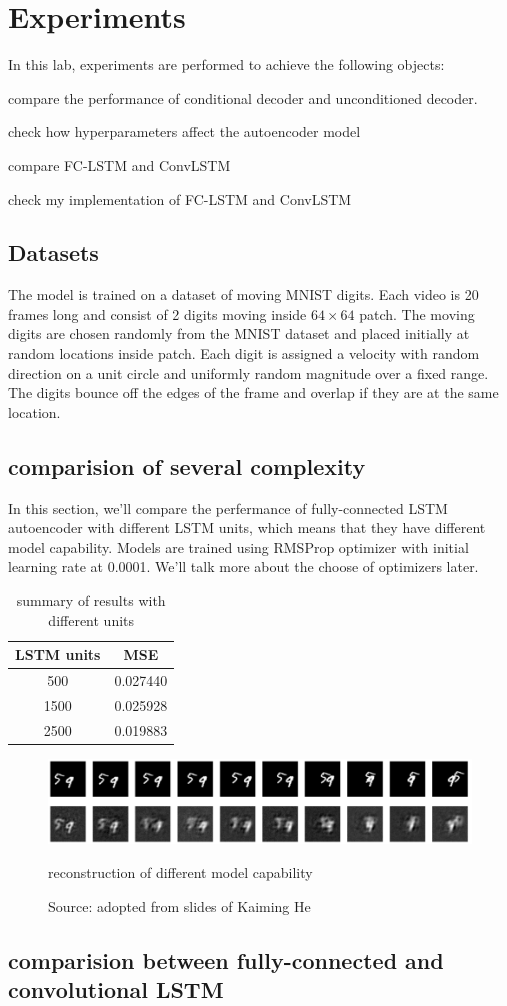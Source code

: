 \documentclass[twoside,a4paper,article]{combine}
\begin{document}
\section{Experiments}
In this lab, experiments are performed to achieve the following objects:

compare the performance of conditional decoder and unconditioned decoder.

check how hyperparameters affect the autoencoder model

compare FC-LSTM and ConvLSTM 

check my implementation of FC-LSTM and ConvLSTM
\subsection{Datasets}
The model is trained on a dataset of moving MNIST digits. Each video is 20 frames long and consist of 2 digits moving inside $64\times64$
patch. The moving digits are chosen randomly from the MNIST dataset and placed initially at random locations inside patch. Each digit is
assigned a velocity with random direction on a unit circle and uniformly random magnitude over a fixed range. The digits bounce off the 
edges of the frame and overlap if they are at the same location.

\subsection{comparision of several complexity}
In this section, we'll compare the perfermance of fully-connected LSTM autoencoder with different LSTM units, which means that they have
different model capability. Models are trained using RMSProp optimizer with initial learning rate at 0.0001. We'll talk more about the
choose of optimizers later.

\begin{table}[h!]
\centering
\begin{tabular}{ c c } 
    \hline
    LSTM units & MSE \\
    \hline
    500 & 0.027440 \\
    1500 & 0.025928 \\
    2500 & 0.019883 \\
    \hline
    \end{tabular}
    \caption{summary of results with different units}
\label{table:units}
\end{table}

\begin{figure}[ht!]
    \includegraphics[width=\linewidth]{fc-builtin-2500-200}
    \caption{reconstruction of different model capability}
    \caption*{Source: adopted from slides of Kaiming He}
    \label{fig:units}
\end{figure}

\subsection{comparision between fully-connected and convolutional LSTM}




\end{document}
